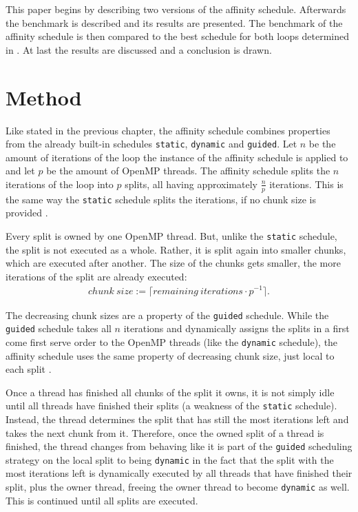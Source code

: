 \documentclass[twoside,11pt]{article}
\begin{document}
This paper begins by describing two versions of the
affinity schedule. Afterwards the benchmark is described
and its results are presented. The benchmark of the
affinity schedule is then compared to the best schedule for
both loops determined in \citet{b1}.
At last the results are discussed and a conclusion is
drawn.


\section{Method} %
\label{sec:method}

Like stated in the previous chapter, the affinity schedule
combines properties from the already built-in schedules
\texttt{static}, \texttt{dynamic} and \texttt{guided}.
Let $n$ be the amount of iterations of the loop the
instance of the affinity schedule is applied to and let $p$
be the amount of OpenMP threads.
The affinity schedule splits the $n$ iterations of the
loop into $p$ splits, all having approximately
$\frac{n}{p}$ iterations.
This is the same way the \texttt{static} schedule splits
the iterations, if no chunk size is provided
\citep[see][Chapter 2]{omp}.

Every split is owned by one OpenMP thread. But, unlike the
\texttt{static} schedule, the split is not executed as a
whole.
Rather, it is split again into smaller chunks, which are
executed after another.
The size of the chunks gets smaller, the more iterations
of the split are already executed:
\begin{align*}
  chunk\ size := \lceil remaining\ iterations \cdot p^{-1} \rceil.
\end{align*}

The decreasing chunk sizes are a property of the
\texttt{guided} schedule.
While the \texttt{guided} schedule takes all $n$ iterations
and dynamically assigns the splits in a first come first
serve order to the OpenMP threads (like the
\texttt{dynamic} schedule), the affinity schedule
uses the same property of decreasing chunk size, just local
to each split \citep[see][Chapter 2]{omp}.

Once a thread has finished all chunks of the split it owns,
it is not simply idle until all threads have finished their
splits (a weakness of the \texttt{static} schedule).
Instead, the thread determines the split that has still the
most iterations left and takes the next chunk from it.
Therefore, once the owned split of a thread is finished,
the thread changes from behaving like it is part of the
\texttt{guided} scheduling strategy on the local split to
being \texttt{dynamic} in the fact that the split with the
most iterations left is dynamically executed by all threads
that have finished their split, plus the owner thread,
freeing the owner thread to become \texttt{dynamic} as
well.
This is continued until all splits are executed.
\end{document}
